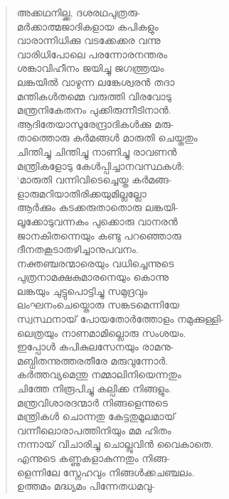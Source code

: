 \begin{verse}
അക്കഥനില്ക്ക, ദശരഥപുത്രരു-\\
മര്‍ക്കാത്മജാദികളായ കപികളും\\
വാരാന്നിധിക്കു വടക്കേക്കര വന്നു\\
വാരിധിപോലെ പരന്നോരനന്തരം\\
ശങ്കാവിഹീനം ജയിച്ചു ജഗത്ത്രയം\\
ലങ്കയില്‍ വാഴുന്ന ലങ്കേശ്വരന്‍ തദാ\\
മന്തികള്‍തമ്മെ വരുത്തി വിരവോടു\\
മന്ത്രനികേതനം പുക്കിരുന്നീടിനാന്‍.\\
ആദിതേയാസുരേന്ദ്രാദികള്‍ക്കു മരു-\\
താത്തൊരു കര്‍മങ്ങള്‍ മാരുതി ചെയ്തതും\\
ചിന്തിച്ചു ചിന്തിച്ചു നാണിച്ചു രാവണന്‍\\
മന്ത്രികളോടു കേള്‍പ്പിച്ചാനവസ്ഥകള്‍:\\
‘മാരുതി വന്നിവിടെച്ചെയ്ത കര്‍മങ്ങ-\\
ളാരുമറിയാതിരിക്കയുമില്ലല്ലോ\\
ആര്‍ക്കും കടക്കരുതാതൊരു ലങ്കയി-\\
ലൂക്കോടുവന്നകം പുക്കൊരു വാനരന്‍\\
ജാനകിതന്നെയും കണ്ടു പറഞ്ഞൊരു\\
ദീനതകൂടാതഴിച്ചാനുപവനം.\\
നക്തഞ്ചരന്മാരെയും വധിച്ചെന്നുടെ\\
പുത്രനാമക്ഷകുമാരനെയും കൊന്നു\\
ലങ്കയും ചുട്ടുപൊട്ടിച്ചു സമുദ്രവും\\
ലംഘനംചെയ്തൊരു സങ്കടമെന്നിയേ\\
സ്വസ്ഥനായ് പോയതോര്‍ത്തോളം നമുക്കുള്ളി-\\
ലെത്രയും നാണമാമില്ലൊരു സംശയം.\\
ഇപ്പോള്‍ കപികുലസേനയും രാമനു-\\
മബ്ധിതന്നുത്തരതീരേ മരുവുന്നോര്‍.\\
കര്‍ത്തവ്യമെന്തു നമ്മാലിനിയെന്നതും\\
ചിത്തേ നിരൂപിച്ചു കല്പിക്ക നിങ്ങളും.\\
മന്ത്രവിശാരദന്മാര്‍ നിങ്ങളെന്നുടെ\\
മന്ത്രികള്‍ ചൊന്നതു കേട്ടതുമൂലമായ്\\
വന്നീലൊരാപത്തിനിയും മമ ഹിതം\\
നന്നായ് വിചാരിച്ചു ചൊല്ലുവിന്‍ വൈകാതെ.\\
എന്നുടെ കണ്ണുകളാകുന്നതും നിങ്ങ-\\
ളെന്നിലേ സ്നേഹവും നിങ്ങള്‍ക്കചഞ്ചലം.\\
ഉത്തമം മദ്ധ്യമം പിന്നേതധമവു-\\

\end{verse}
